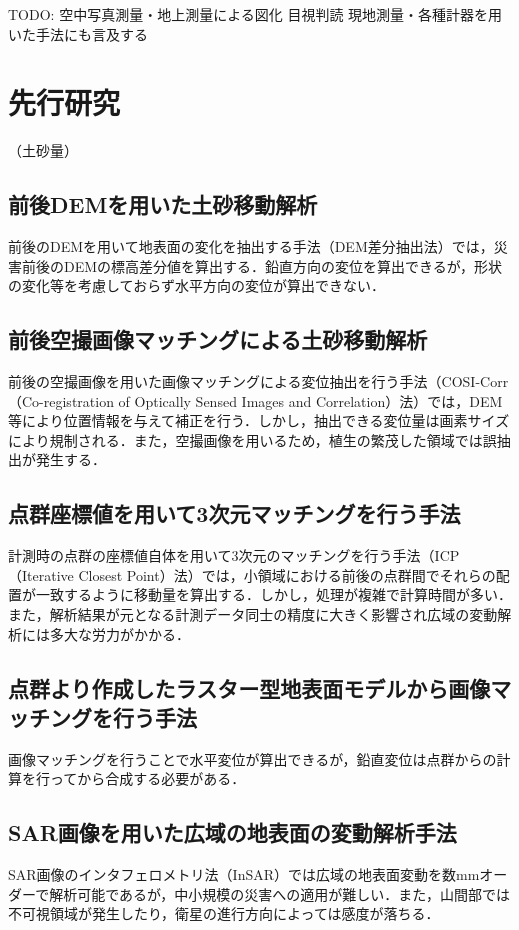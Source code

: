     TODO: 空中写真測量・地上測量による図化
    目視判読
    現地測量・各種計器を用いた手法にも言及する

  \section{先行研究}
（土砂量）


    \subsection{前後DEMを用いた土砂移動解析}
      前後のDEMを用いて地表面の変化を抽出する手法（DEM差分抽出法）では，災害前後のDEMの標高差分値を算出する．鉛直方向の変位を算出できるが，形状の変化等を考慮しておらず水平方向の変位が算出できない．

    \subsection{前後空撮画像マッチングによる土砂移動解析}
      前後の空撮画像を用いた画像マッチングによる変位抽出を行う手法（COSI-Corr（Co-registration of Optically Sensed Images and Correlation）法）では，DEM等により位置情報を与えて補正を行う．しかし，抽出できる変位量は画素サイズにより規制される．また，空撮画像を用いるため，植生の繁茂した領域では誤抽出が発生する．

    \subsection{点群座標値を用いて3次元マッチングを行う手法}
      計測時の点群の座標値自体を用いて3次元のマッチングを行う手法（ICP（Iterative Closest Point）法）では，小領域における前後の点群間でそれらの配置が一致するように移動量を算出する．しかし，処理が複雑で計算時間が多い．また，解析結果が元となる計測データ同士の精度に大きく影響され広域の変動解析には多大な労力がかかる．

    \subsection{点群より作成したラスター型地表面モデルから画像マッチングを行う手法}
      画像マッチングを行うことで水平変位が算出できるが，鉛直変位は点群からの計算を行ってから合成する必要がある．

    \subsection{SAR画像を用いた広域の地表面の変動解析手法}
      SAR画像のインタフェロメトリ法（InSAR）では広域の地表面変動を数mmオーダーで解析可能であるが，中小規模の災害への適用が難しい．また，山間部では不可視領域が発生したり，衛星の進行方向によっては感度が落ちる．

